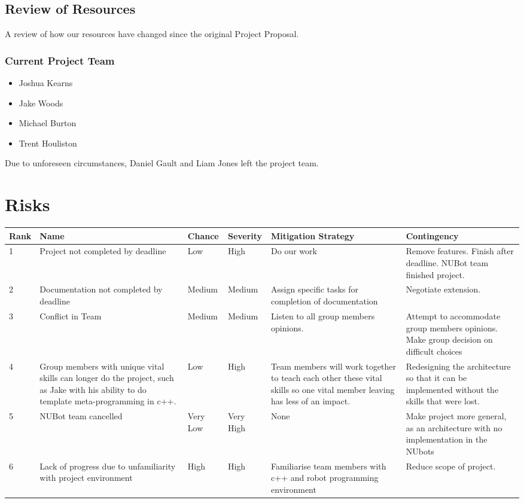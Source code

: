 \documentclass[english,12pt]{scrartcl}
\begin{document}
		\subsection {Review of Resources}
			A review of how our resources have changed since the original Project Proposal.
			\subsubsection{Current Project Team}
				\begin{itemize}
					\item Joshua Kearns
					\item Jake Woods
					\item Michael Burton
					\item Trent Houliston
				\end{itemize}
				Due to unforeseen circumstances, Daniel Gault and Liam Jones left the project team.

\newpage
	\section{Risks}
		\begin{table}[htbp]
		\begin{tabularx}{\linewidth}{ | m{0.6cm} |  X | m{1.05cm} |  m{1.05cm} |  X | X |}
			\hline
			Rank & Name & Chance & Severity & Mitigation Strategy & Contingency \\  \hline
			1 & Project not completed by deadline & Low & High & Do our work & Remove features. Finish after deadline. NUBot team finished project. \\ \hline
			2 & Documentation not completed by deadline & Medium & Medium & Assign specific tasks for completion of documentation & Negotiate extension. \\ \hline
			3 & Conflict in Team & Medium & Medium & Listen to all group members opinions. & Attempt to accommodate group members opinions. Make group decision on difficult choices \\ \hline
			4 & Group members with unique vital skills can longer do the project, such as Jake with his ability to do template meta-programming in c++. & Low & High & Team members will work together to teach each other these vital skills so one vital member leaving has less of an impact. & Redesigning the architecture so that it can be implemented without the skills that were lost. \\ \hline
			5 & NUBot team cancelled & Very Low & Very High & None & Make project more general, as an architecture with no implementation in the NUbots \\ \hline
			6 & Lack of progress due to unfamiliarity with project environment & High & High & Familiarise team members with c++ and robot programming environment & Reduce scope of project. \\ \hline
		\end{tabularx}
		\end{table}
\end{document}
